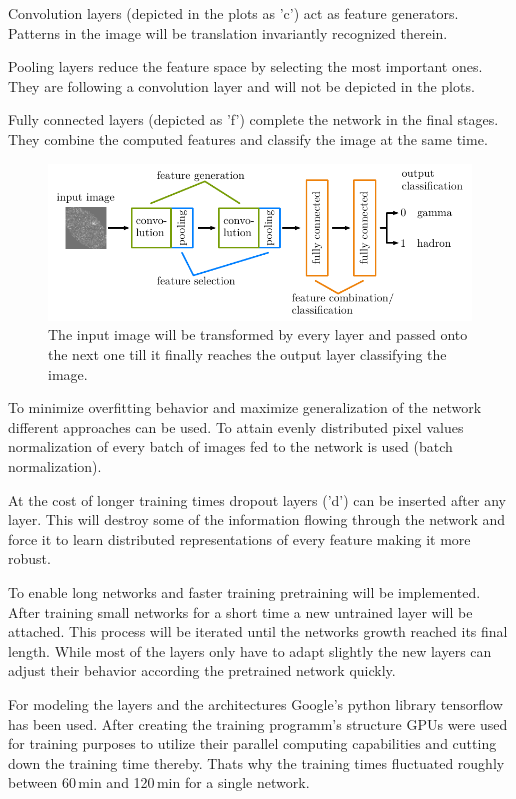 Convolution layers (depicted in the plots as 'c') act as feature generators.
Patterns in the image will be translation invariantly recognized therein.

Pooling layers reduce the feature space by selecting the most important ones.
They are following a convolution layer and will not be depicted in the plots.

Fully connected layers (depicted as 'f') complete the network in the final stages.
They combine the computed features and classify the image at the same time.

\begin{figure}
    \centering
    \includegraphics[scale=1]{Plots/CNN_Example.pdf}
    \caption{The input image will be transformed by every layer and passed onto the next one till it finally reaches the output layer classifying the image.}
    \label{fig:cnn_example}
\end{figure}

To minimize overfitting behavior and maximize generalization of the network different approaches can be used.
To attain evenly distributed pixel values normalization of every batch of images fed to the network is used (batch normalization).

At the cost of longer training times dropout layers ('d') can be inserted after any layer.
This will destroy some of the information flowing through the network
and force it to learn distributed representations of every feature making it more robust.

To enable long networks and faster training pretraining will be implemented.
After training small networks for a short time a new untrained layer will be attached.
This process will be iterated until the networks growth reached its final length.
While most of the layers only have to adapt slightly
the new layers can adjust their behavior according the pretrained network quickly.

For modeling the layers and the architectures Google's python library tensorflow has been used.
After creating the training programm's structure GPUs were used for training purposes
to utilize their parallel computing capabilities and cutting down the training time thereby.
Thats why the training times fluctuated roughly between \num{60}\,\si{\minute} and \num{120}\,\si{\minute} for a single network.
